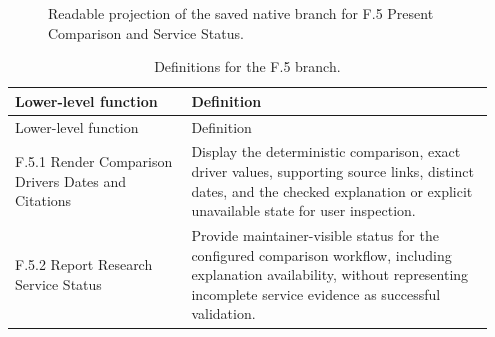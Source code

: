 \documentclass[11pt,letterpaper]{article}
\begin{document}
\begin{figure}[H]\centering
{}
\caption{Readable projection of the saved native branch for F.5 Present Comparison and Service Status.}\label{fig:branch5}\end{figure}
\begin{longtable}{@{}>{\raggedright\arraybackslash}p{0.35\linewidth}>{\raggedright\arraybackslash}p{0.6\linewidth}@{}}
\caption{Definitions for the F.5 branch.}\\
\toprule Lower-level function & Definition\\\midrule\endfirsthead
\toprule Lower-level function & Definition\\\midrule\endhead
F.5.1 Render Comparison Drivers Dates and Citations & Display the deterministic comparison, exact driver values, supporting source links, distinct dates, and the checked explanation or explicit unavailable state for user inspection.\\[5pt]
F.5.2 Report Research Service Status & Provide maintainer-visible status for the configured comparison workflow, including explanation availability, without representing incomplete service evidence as successful validation.\\[5pt]
\bottomrule\end{longtable}
\end{document}
